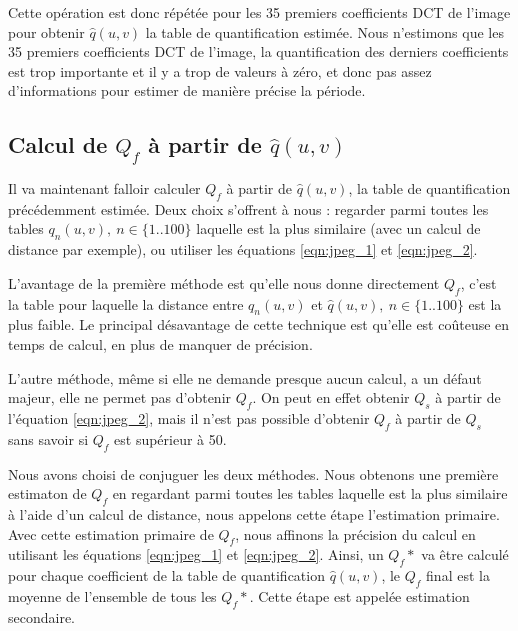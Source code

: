 \documentclass[utf8,final]{stageM2R} %
\begin{document}
Cette opération est donc répétée pour les 35 premiers coefficients DCT de l'image pour obtenir $\widehat{q}(u,v)$ la table de quantification estimée. Nous n'estimons que les 35 premiers coefficients DCT de l'image, la quantification des derniers coefficients est trop importante et il y a trop de valeurs à zéro, et donc pas assez d'informations pour estimer de manière précise la période.

\subsection{Calcul de $Q_f$ à partir de $\widehat{q}(u,v)$}
\label{sec:estimation}
Il va maintenant falloir calculer $Q_f$ à partir de $\widehat{q}(u,v)$, la table de quantification précédemment estimée. Deux choix s'offrent à nous : regarder parmi toutes les tables $q_n(u,v),\ n\in\{1..100\}$ laquelle est la plus similaire (avec un calcul de distance par exemple), ou utiliser les équations \ref{eqn:jpeg_1} et \ref{eqn:jpeg_2}. 

L'avantage de la première méthode est qu'elle nous donne directement $Q_f$, c'est la table pour laquelle la distance entre $q_n(u,v)$ et $\widehat{q}(u,v),\ n\in \{1..100\}$ est la plus faible. Le principal désavantage de cette technique est qu'elle est coûteuse en temps de calcul, en plus de manquer de précision.

L'autre méthode, même si elle ne demande presque aucun calcul, a un défaut majeur, elle ne permet pas d'obtenir $Q_f$. On peut en effet obtenir $Q_s$ à partir de l'équation \ref{eqn:jpeg_2}, mais il n'est pas possible d'obtenir $Q_f$ à partir de $Q_s$ sans savoir si $Q_f$ est supérieur à 50.

Nous avons choisi de conjuguer les deux méthodes. Nous obtenons une première estimaton de $Q_f$ en regardant parmi toutes les tables laquelle est la plus similaire à l'aide d'un calcul de distance, nous appelons cette étape l'estimation primaire. Avec cette estimation primaire de $Q_f$, nous affinons la précision du calcul en utilisant les équations \ref{eqn:jpeg_1} et \ref{eqn:jpeg_2}. Ainsi, un $Q_f*$ va être calculé pour chaque coefficient de la table de quantification $\widehat{q}(u,v)$, le $Q_f$ final est la moyenne de l'ensemble de tous les $Q_f*$. Cette étape est appelée estimation secondaire.
\end{document}
